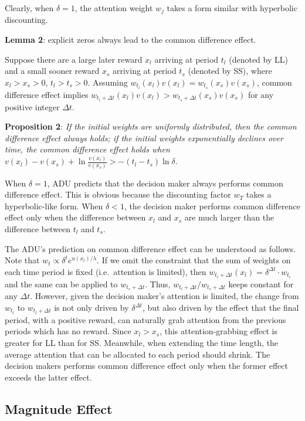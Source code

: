 \documentclass[
  12pt,
]{article}
\begin{document}
Clearly, when \(\delta=1\), the attention weight \(w_j\) takes a form
similar with hyperbolic discounting.

\textbf{Lemma 2}: explicit zeros always lead to the common difference
effect.

Suppose there are a large later reward \(x_l\) arriving at period
\(t_l\) (denoted by LL) and a small sooner reward \(x_s\) arriving at
period \(t_s\) (denoted by SS), where \(x_l>x_s>0\), \(t_l>t_s>0\).
Assuming \(w_{t_l}(x_l)v(x_l)=w_{t_s}(x_s)v(x_s)\), common difference
effect implies
\(w_{t_l+\Delta t}(x_l)v(x_l)>w_{t_s+\Delta t}(x_s)v(x_s)\) for any
positive integer \(\Delta t\)\citep{loewenstein_anomalies_1992}.

\textbf{Proposition 2}: \emph{If the initial weights are uniformly
distributed, then the common difference effect always holds; if the
initial weights exponentially declines over time, the common difference
effect holds when}
\(v(x_l)-v(x_s)+\ln\frac{v(x_l)}{v(x_s)}>-(t_l-t_s)\ln\delta\)\emph{.}

When \(\delta = 1\), ADU predicts that the decision maker always
performs common difference effect. This is obvious because the
discounting factor \(w_T\) takes a hyperbolic-like form. When
\(\delta<1\), the decision maker performs common difference effect only
when the difference between \(x_l\) and \(x_s\) are much larger than the
difference between \(t_l\) and \(t_s\).

The ADU's prediction on common difference effect can be understood as
follows. Note that \(w_t \propto \delta^t e^{u(x_t)/\lambda}\). If we
omit the constraint that the sum of weights on each time period is fixed
(i.e.~attention is limited), then
\(w_{t_l+\Delta t}(x_l) = \delta^{\Delta t} \cdot w_{t_l}\) and the same
can be applied to \(w_{t_s+\Delta t}\). Thus,
\(w_{t_l+\Delta t} / w_{t_s+\Delta t}\) keeps constant for any
\(\Delta t\). However, given the decision maker's attention is limited,
the change from \(w_{t_l}\) to \(w_{t_l+\Delta t}\) is not only driven
by \(\delta^{\Delta t}\), but also driven by the effect that the final
period, with a positive reward, can naturally grab attention from the
previous periods which has no reward. Since \(x_l > x_s\), this
attention-grabbing effect is greater for LL than for SS. Meanwhile, when
extending the time length, the average attention that can be allocated
to each period should shrink. The decision makers performs common
difference effect only when the former effect exceeds the latter effect.

\hypertarget{magnitude-effect}{%
\subsection{Magnitude Effect}\label{magnitude-effect}}
\end{document}

